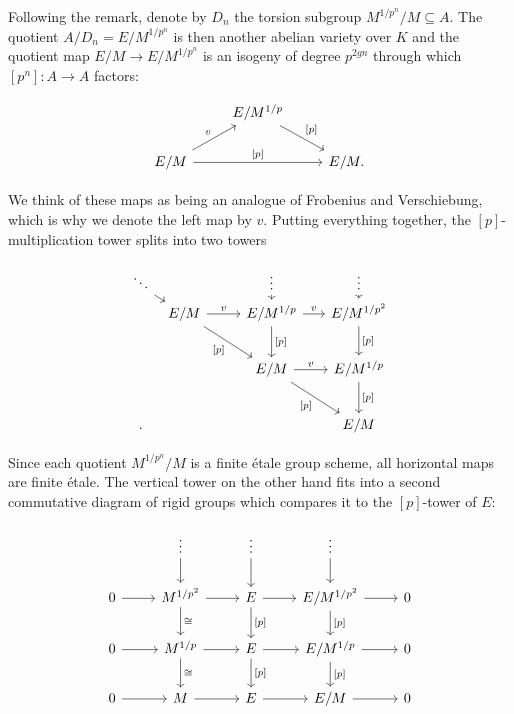 \documentclass[10pt,oneside]{amsart}
\theoremstyle{definition}
\begin{document}
	Following the remark, denote by $D_n$ the torsion subgroup $M^{1/p^n}/M\subseteq A$. The quotient $A/D_n = E/M^{1/p^n}$ is then another abelian variety over $K$ and the quotient map $E/M\rightarrow E/M^{1/p^n}$ is an isogeny of degree $p^{2gn}$  through which  $[p^n]:A\rightarrow A$ factors: 
		\begin{center}
			\begin{equation}\label{factorisation of [p] over E/M}
			\begin{tikzcd}
				& E/M^{1/p} \arrow[rd, "{[p]}"] &  \\
				E/M \arrow[rr, "{[p]}"] \arrow[ru,"v"] &  & E/M.
			\end{tikzcd}
			\end{equation}
		\end{center}
		We think of these maps as being an analogue of Frobenius and Verschiebung, which is why we denote the left map by $v$.
		Putting everything together, the $[p]$-multiplication tower splits into two towers
		\begin{center}
		\begin{equation}\label{p-multiplication tower of E/M splits into vertical and horizontal tower}
		\begin{tikzcd}[column sep={1.1cm,between origins},row sep={0.7cm,between origins}]
			\ddots \arrow[rd] &  &  & \vdots \arrow[d] &  & \vdots \arrow[d] \\
			& E/M \arrow[rr,"v"] \arrow[rrdd, "{[p]}"'] &  & E/M^{1/p} \arrow[rr,"v"] \arrow[dd,"{[p]}"] &  & E/M^{1/p^2} \arrow[dd,"{[p]}"] \\
			&  &  &  &  &  \\
			&  &  & E/M \arrow[rrdd, "{[p]}"'] \arrow[rr,"v"] &  & E/M^{1/p} \arrow[dd,"{[p]}"] \\
			&  &  &  &  &  \\.
			&  &  &  &  & E/M
		\end{tikzcd}
		\end{equation}
		\end{center}
		Since each quotient $M^{1/p^n}/M$ is a finite \'etale group scheme, all horizontal maps are finite \'etale. The vertical tower on the other hand fits into a second commutative diagram of rigid groups which compares it to the $[p]$-tower of $E$:
		
		\begin{center}
		\begin{equation}\label{F-tower for E/M}
		\begin{tikzcd}
			& \vdots \arrow[d] & \vdots \arrow[d] & \vdots \arrow[d] &  \\
			0 \arrow[r] & M^{1/p^2} \arrow[d, "\cong"] \arrow[r] & E \arrow[d, "{[p]}"] \arrow[r] & E/M^{1/p^2} \arrow[d, "{[p]}"] \arrow[r] & 0 \\
			0 \arrow[r] & M^{1/p} \arrow[d, "\cong"] \arrow[r] & E \arrow[d, "{[p]}"] \arrow[r] & E/M^{1/p} \arrow[d, "{[p]}"] \arrow[r] & 0 \\
			0 \arrow[r] & M \arrow[r] & E \arrow[r] & E/M \arrow[r] & 0
		\end{tikzcd}
		\end{equation}
		\end{center}
		
\end{document}
